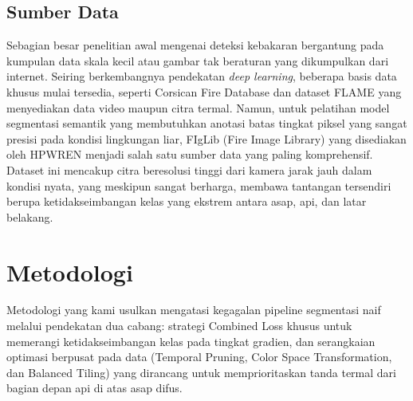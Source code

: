 \documentclass[conference]{IEEEtran}
\begin{document}
\subsection{Sumber Data}
Sebagian besar penelitian awal mengenai deteksi kebakaran bergantung pada kumpulan data skala kecil atau gambar tak beraturan yang dikumpulkan dari internet. Seiring berkembangnya pendekatan \textit{deep learning}, beberapa basis data khusus mulai tersedia, seperti Corsican Fire Database dan dataset FLAME yang menyediakan data video maupun citra termal. Namun, untuk pelatihan model segmentasi semantik yang membutuhkan anotasi batas tingkat piksel yang sangat presisi pada kondisi lingkungan liar, FIgLib (Fire Image Library) yang disediakan oleh HPWREN menjadi salah satu sumber data yang paling komprehensif. Dataset ini mencakup citra beresolusi tinggi dari kamera jarak jauh dalam kondisi nyata, yang meskipun sangat berharga, membawa tantangan tersendiri berupa ketidakseimbangan kelas yang ekstrem antara asap, api, dan latar belakang.

\section{Metodologi}
\label{sec:methodology}

Metodologi yang kami usulkan mengatasi kegagalan pipeline segmentasi naif melalui pendekatan dua cabang: strategi Combined Loss khusus untuk memerangi ketidakseimbangan kelas pada tingkat gradien, dan serangkaian optimasi berpusat pada data (Temporal Pruning, Color Space Transformation, dan Balanced Tiling) yang dirancang untuk memprioritaskan tanda termal dari bagian depan api di atas asap difus.
\end{document}
